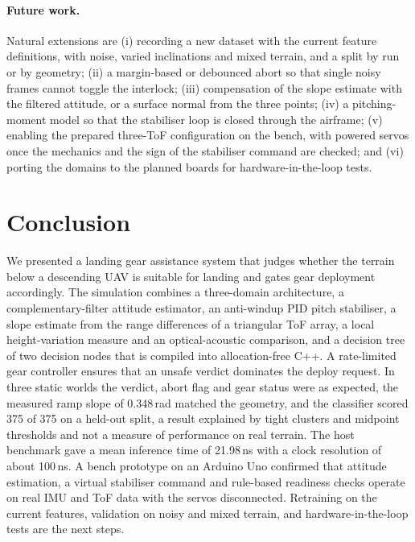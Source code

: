 \documentclass[11pt,a4paper]{article}
\begin{document}
\paragraph{Future work.} Natural extensions are (i) recording a new dataset with the current feature definitions, with noise, varied inclinations and mixed terrain, and a split by run or by geometry; (ii) a margin-based or debounced abort so that single noisy frames cannot toggle the interlock; (iii) compensation of the slope estimate with the filtered attitude, or a surface normal from the three points; (iv) a pitching-moment model so that the stabiliser loop is closed through the airframe; (v) enabling the prepared three-ToF configuration on the bench, with powered servos once the mechanics and the sign of the stabiliser command are checked; and (vi) porting the domains to the planned boards for hardware-in-the-loop tests.
 
\section{Conclusion}\label{sec:conclusion}
We presented a landing gear assistance system that judges whether the terrain below a descending UAV is suitable for landing and gates gear deployment accordingly. The simulation combines a three-domain architecture, a complementary-filter attitude estimator, an anti-windup PID pitch stabiliser, a slope estimate from the range differences of a triangular ToF array, a local height-variation measure and an optical-acoustic comparison, and a decision tree of two decision nodes that is compiled into allocation-free C++. A rate-limited gear controller ensures that an unsafe verdict dominates the deploy request. In three static worlds the verdict, abort flag and gear status were as expected, the measured ramp slope of 0.348\,rad matched the geometry, and the classifier scored 375 of 375 on a held-out split, a result explained by tight clusters and midpoint thresholds and not a measure of performance on real terrain. The host benchmark gave a mean inference time of 21.98\,ns with a clock resolution of about 100\,ns. A bench prototype on an Arduino Uno confirmed that attitude estimation, a virtual stabiliser command and rule-based readiness checks operate on real IMU and ToF data with the servos disconnected. Retraining on the current features, validation on noisy and mixed terrain, and hardware-in-the-loop tests are the next steps.
 
\end{document}
